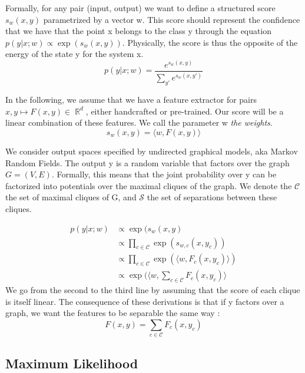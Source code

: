 \documentclass{article}
\DeclareMathOperator{\R}{\mathbb{R}}
\DeclareMathOperator{\1}{\mathbb{1}}
\begin{document}
Formally, for any pair (input, output) we want to define a structured score $s_w(x, y)$ parametrized by a vector w.
This score should represent the confidence that we have that the point x belongs to the class y through the equation $p(y|x ; w)\propto \exp(s_w(x, y))$.
Physically, the score  is thus the opposite of the energy of the state y for the system x. 
\begin{equation}
	p(y|x; w)=  \frac{e^{s_w(x, y)}}{\sum_{y'} e^{s_w(x, y')}}
\end{equation}

In the following, we assume that we have a feature extractor for pairs $x, y \mapsto F(x, y) \in \R^d$, either handcrafted or pre-trained.
Our score will be a linear combination of these features.
We call the parameter w \textit{the weights}.
\begin{equation}
	s_w(x, y) = \langle w, F(x, y) \rangle
\end{equation}

We consider output spaces specified by undirected graphical models, aka Markov Random Fields.
The output y is a random variable that factors over the graph $G=(V,E)$.
Formally, this means that the joint probability over y can be factorized into potentials over the maximal cliques of the graph.
We denote the $\mathcal{C}$ the set of maximal cliques of G, and $\mathcal{S}$ the set of separations between these cliques.

\begin{align*}
	p(y|x ; w) & \propto  \exp(s_w(x, y) \\
	& \propto \prod_{c\in \mathcal{C}} \exp(s_{w, c}(x, y_c))\\
	& \propto  \prod_{c\in \mathcal{C}} \exp(\langle w, F_c(x, y_c) \rangle) \\
	& \propto \exp( \langle w, \sum_{c\in \mathcal{C}} F_c(x, y_c) \rangle 
\end{align*}
We go from the second to the third line by assuming that the score of each clique is itself linear.
The consequence of these derivations is that if y factors over a graph, we want the features to be separable the same way :
\begin{equation}
	F(x, y) =  \sum_{c\in \mathcal{C}} F_c(x, y_c)
\end{equation}


\subsection{Maximum Likelihood}
\end{document}
